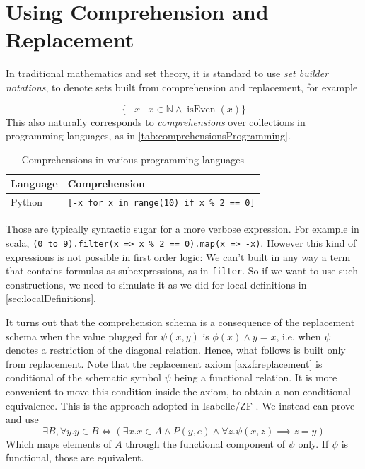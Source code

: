\section{Using Comprehension and Replacement}

In traditional mathematics and set theory, it is standard to use \textit{set builder notations}, to denote sets built from comprehension and replacement, for example

$$\lbrace -x \mid x\in \mathbb N \land \operatorname{isEven}(x) \rbrace$$
This also naturally corresponds to \textit{comprehensions} over collections in programming languages, as in \autoref{tab:comprehensionsProgramming}.
\begin{table}[h]
  \begin{tabular}{l|l}
    \textbf{Language} & \textbf{Comprehension} \\ \hline
    Python            & \lstinline$[-x for x in range(10) if x % 2 == 0]$ \\
      Haskell           & \lstinline$[-x | x <- [0..9], even x]$ \\
      Scala             & \lstinline$for (x <- 0 to 9 if x % 2 == 0) yield -x$ \\
      \end{tabular}
      \caption{Comprehensions in various programming languages}
      \label{tab:comprehensionsProgramming}
    \end{table}
    Those are typically syntactic sugar for a more verbose expression. For example in scala, \lstinline|(0 to 9).filter(x => x % 2 == 0).map(x => -x)|. However this kind of expressions is not possible in first order logic: We can't built in any way a term that contains formulas as subexpressions, as in \lstinline|filter|. So if we want to use such constructions, we need to simulate it as we did for local definitions in \autoref{sec:localDefinitions}.

      It turns out that the comprehension schema is a consequence of the replacement schema when the value plugged for $\psi(x, y)$ is $\phi(x) \land y = x$, i.e. when $\psi$ denotes a restriction of the diagonal relation. Hence, what follows is built only from replacement.
      Note that the replacement axiom \autoref{axzf:replacement} is conditional of the schematic symbol $\psi$ being a functional relation. It is more convenient to move this condition inside the axiom, to obtain a non-conditional equivalence. This is the approach adopted in Isabelle/ZF \cite{noelExperimentingIsabelleZF1993}. We instead can prove and use
      $$ \exists B, \forall y. y \in B \iff (\exists x. x \in A \land P(y, e) \land ∀ z. \psi(x, z) \implies z = y) $$
      Which maps elements of $A$ through the functional component of $\psi$ only. If $\psi$ is functional, those are equivalent.

